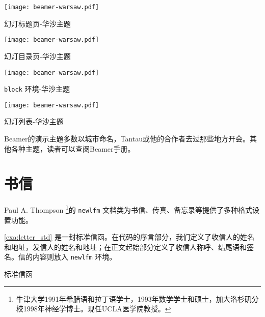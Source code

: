 \begin{example}[h]
\begin{Demo}
\centering
\texttt{[image: beamer-warsaw.pdf]}
\end{Demo}
\caption{幻灯标题页-华沙主题}
\label{exa:beamer_title_warsaw}
\end{example}

\begin{example}[!h]
\begin{Demo}
\centering
\texttt{[image: beamer-warsaw.pdf]}
\end{Demo}
\caption{幻灯目录页-华沙主题}
\label{exa:beamer_toc_warsaw}
\end{example}

\begin{example}[h]
\begin{Demo}
\centering
\texttt{[image: beamer-warsaw.pdf]}
\end{Demo}
\caption{\texttt{block} 环境-华沙主题}
\label{exa:beamer_block_warsaw}
\end{example}

\begin{example}[!h]
\begin{Demo}
\centering
\texttt{[image: beamer-warsaw.pdf]}
\end{Demo}
\caption{幻灯列表-华沙主题}
\label{exa:beamer_list_warsaw}
\end{example}

Beamer的演示主题多数以城市命名，Tantau或他的合作者去过那些地方开会。其他各种主题，读者可以查阅Beamer手册。

\section{书信}

Paul A. Thompson\indexThompson{} \footnote{牛津大学1991年希腊语和拉丁语学士，1993年数学学士和硕士，加大洛杉矶分校1998年神经学博士。现任UCLA医学院教授。}的 \texttt{newlfm} \citep{Thompson_2009}文档类为书信、传真、备忘录等提供了多种格式设置功能。

\autoref{exa:letter_std} 是一封标准信函。在代码的序言部分，我们定义了收信人的姓名和地址，发信人的姓名和地址；在正文起始部分定义了收信人称呼、结尾语和签名。信的内容则放入 \texttt{newlfm} 环境。

\begin{example}[h]
\caption{标准信函}
\label{exa:letter_std}
\end{example}


